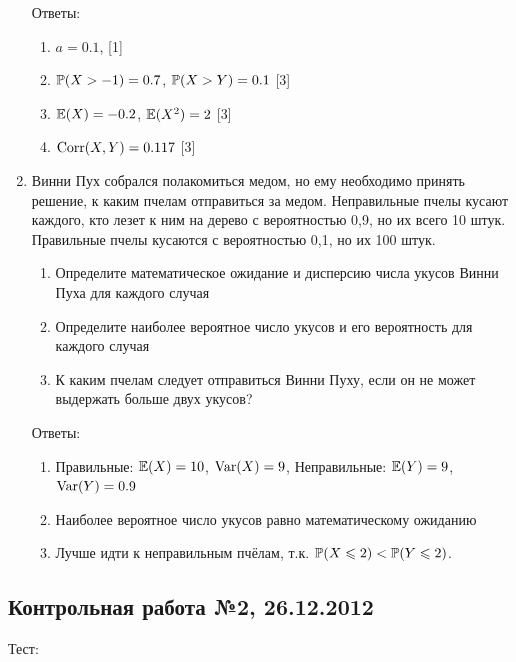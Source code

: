 \documentclass[12pt, a4paper]{article}\usepackage[]{graphicx}\usepackage[]{color}
\begin{document}
\begin{enumerate}
Ответы:
\begin{enumerate}
\item $a=0.1$, [1]
\item $\P(X>-1)=0.7$, $\P(X>Y)=0.1$ [3]
\item $\E(X)=-0.2$, $\E(X^2)=2$ [3]
\item $\Corr(X,Y)=0.117$ [3]
\end{enumerate}

\item Винни Пух собрался полакомиться медом, но ему необходимо принять решение, к каким пчелам отправиться за медом. Неправильные пчелы кусают каждого, кто лезет к ним на дерево с вероятностью 0,9, но их всего 10 штук. Правильные пчелы кусаются с вероятностью 0,1, но их 100 штук.
\begin{enumerate}
\item  Определите математическое ожидание и дисперсию числа укусов Винни Пуха для каждого случая
\item Определите наиболее вероятное число укусов и его вероятность для каждого случая
\item К каким пчелам следует отправиться Винни Пуху, если он не может выдержать больше двух укусов?
\end{enumerate}

Ответы:
\begin{enumerate}
\item Правильные: $\E(X)=10$, $\Var(X)=9$, Неправильные: $\E(Y)=9$, $\Var(Y)=0.9$
\item Наиболее вероятное число укусов равно математическому ожиданию
\item Лучше идти к неправильным пчёлам, т.к. $\P(X\leq 2)<\P(Y\leq 2)$.
\end{enumerate}

\end{enumerate}

\subsection{Контрольная работа №2, 26.12.2012}

Тест:
\end{document}
